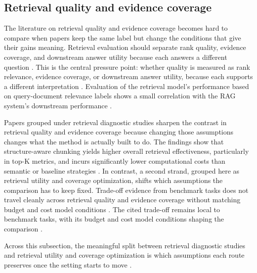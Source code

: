 \documentclass[a4paper,11pt]{article}
\begin{document}
\subsection{Retrieval quality and evidence coverage}


The literature on retrieval quality and evidence coverage becomes hard to compare when papers keep the same label but change the conditions that give their gains meaning. Retrieval evaluation should separate rank quality, evidence coverage, and downstream answer utility because each answers a different question \citep{Salemi2024Evaluating,Taiwo2026Evaluating,Sun2026Robust,Kim2024Learning}. This is the central pressure point: whether quality is measured as rank relevance, evidence coverage, or downstream answer utility, because each supports a different interpretation \citep{Salemi2024Evaluating,Taiwo2026Evaluating,Sun2026Robust,Kim2024Learning}. Evaluation of the retrieval model's performance based on query-document relevance labels shows a small correlation with the RAG system's downstream performance \citep{Salemi2024Evaluating}.

Papers grouped under retrieval diagnostic studies sharpen the contrast in retrieval quality and evidence coverage because changing those assumptions changes what the method is actually built to do. The findings show that structure-aware chunking yields higher overall retrieval effectiveness, particularly in top-K metrics, and incurs significantly lower computational costs than semantic or baseline strategies \citep{Taiwo2026Evaluating}. In contrast, a second strand, grouped here as retrieval utility and coverage optimization, shifts which assumptions the comparison has to keep fixed. Trade-off evidence from benchmark tasks does not travel cleanly across retrieval quality and evidence coverage without matching budget and cost model conditions \citep{Sun2026Robust}. The cited trade-off remains local to benchmark tasks, with its budget and cost model conditions shaping the comparison \citep{Kim2024Learning}.

Across this subsection, the meaningful split between retrieval diagnostic studies and retrieval utility and coverage optimization is which assumptions each route preserves once the setting starts to move \citep{Salemi2024Evaluating,Taiwo2026Evaluating,Sun2026Robust,Kim2024Learning}.
\end{document}
